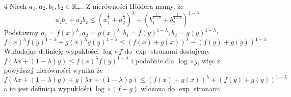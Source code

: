 \documentclass{../note}
\begin{document}
\begin{zadanie}{4}
Niech $a_1, a_2, b_1, b_2 \in \mathbb{R}_+$. Z nierówności Höldera mamy, że
\[a_1b_1 + a_2b_2 \leq \left(a_1^{\frac{1}{\lambda}} + a_2^{\frac{1}{\lambda}}\right)^\lambda + \left(b_1^{\frac{1}{1-\lambda}} + b_2^{\frac{1}{1-\lambda}}\right)^{1-\lambda}\]
Podstawmy $a_1 = f(x)^\lambda, a_2 = g(x)^\lambda, b_1 = f(y)^{1-\lambda}, b_2 = g(y)^{1-\lambda}$:
\[f(x)^\lambda f(y)^{1-\lambda} + g(x)^\lambda g(y)^{1-\lambda} \leq \left(f(x) + g(x)\right)^\lambda + \left(f(y) + g(y)\right)^{1-\lambda}\]
Wkładając definicję wypukłości $\log \circ f$ do $\exp$ stronami dostajemy $f(\lambda x + (1-\lambda)y) \leq f(x)^\lambda f(y)^{1-\lambda}$ i podobnie dla $\log \circ g$, więc z powyższej nierówności wynika że
\[f(\lambda x + (1-\lambda)y) + g(\lambda x + (1-\lambda)y) \leq \left(f(x) + g(x)\right)^\lambda + \left(f(y) + g(y)\right)^{1-\lambda}\]
a to jest definicja wypukłości $\log \circ (f+g)$ włożona do $\exp$ stronami.
\end{zadanie}
\end{document}
